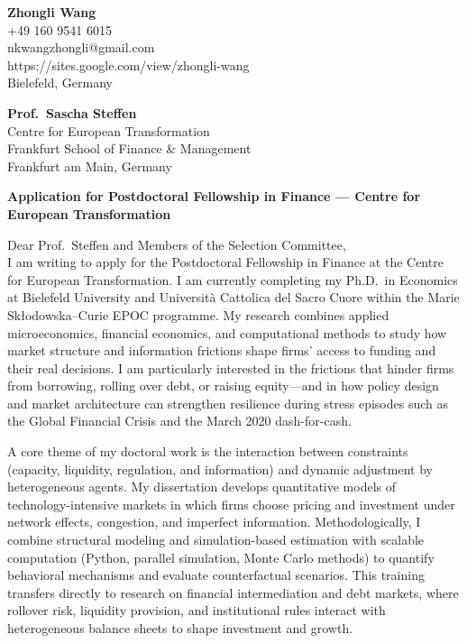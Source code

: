 \documentclass[11pt]{article}
\begin{document}
\noindent
\textbf{Zhongli Wang} \\
+49 160 9541 6015 \\
nkwangzhongli@gmail.com \\
https://sites.google.com/view/zhongli-wang \\
Bielefeld, Germany \\

\vspace{0.5cm}

\noindent
\textbf{Prof.\ Sascha Steffen} \\
Centre for European Transformation \\
Frankfurt School of Finance \& Management \\
Frankfurt am Main, Germany \\

\vspace{0.5cm}

\noindent
\textbf{Application for Postdoctoral Fellowship in Finance --- Centre for European Transformation} \\

\vspace{0.3cm}

\noindent Dear Prof.\ Steffen and Members of the Selection Committee,\\[0.2cm]

I am writing to apply for the Postdoctoral Fellowship in Finance at the Centre for European Transformation. 
I am currently completing my Ph.D.\ in Economics at Bielefeld University and Universit\`a Cattolica del Sacro Cuore within the Marie Sk{\l}odowska--Curie EPOC programme. 
My research combines applied microeconomics, financial economics, and computational methods to study how market structure and information frictions shape firms' access to funding and their real decisions. 
I am particularly interested in the frictions that hinder firms from borrowing, rolling over debt, or raising equity---and in how policy design and market architecture can strengthen resilience during stress episodes such as the Global Financial Crisis and the March 2020 dash-for-cash.

A core theme of my doctoral work is the interaction between constraints (capacity, liquidity, regulation, and information) and dynamic adjustment by heterogeneous agents. 
My dissertation develops quantitative models of technology-intensive markets in which firms choose pricing and investment under network effects, congestion, and imperfect information. 
Methodologically, I combine structural modeling and simulation-based estimation with scalable computation (Python, parallel simulation, Monte Carlo methods) to quantify behavioral mechanisms and evaluate counterfactual scenarios. 
This training transfers directly to research on financial intermediation and debt markets, where rollover risk, liquidity provision, and institutional rules interact with heterogeneous balance sheets to shape investment and growth.
\end{document}
